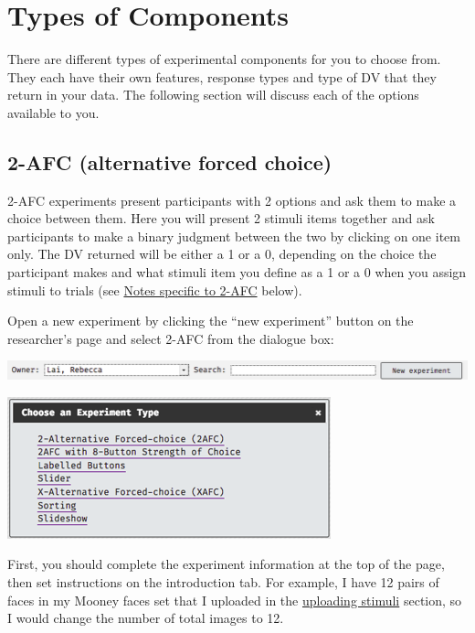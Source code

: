 \documentclass[]{book}
\begin{document}
\hypertarget{exp_types}{\section{Types of Components}\label{exp_types}}

There are different types of experimental components for you to choose
from. They each have their own features, response types and type of DV
that they return in your data. The following section will discuss each
of the options available to you.

\subsection{2-AFC (alternative forced
choice)}\label{afc-alternative-forced-choice}

2-AFC experiments present participants with 2 options and ask them to
make a choice between them. Here you will present 2 stimuli items
together and ask participants to make a binary judgment between the two
by clicking on one item only. The DV returned will be either a 1 or a 0,
depending on the choice the participant makes and what stimuli item you
define as a 1 or a 0 when you assign stimuli to trials (see
\protect\hyperlink{twoafc_notes}{Notes specific to 2-AFC} below).

Open a new experiment by clicking the ``new experiment'' button on the
researcher's page and select 2-AFC from the dialogue box:

\includegraphics{images/screenshots/exp_1.png}

\includegraphics{images/screenshots/exp_2.png}

First, you should complete the experiment information at the top of the
page, then set instructions on the introduction tab. For example, I have
12 pairs of faces in my Mooney faces set that I uploaded in the
\protect\hyperlink{stimupload}{uploading stimuli} section, so I would
change the number of total images to 12.
\end{document}
